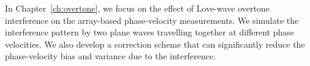 \documentclass[12pt,oneside]{book}
\begin{document}
In Chapter~\ref{ch:overtone}, we focus on the effect of Love-wave overtone interference on the array-based phase-velocity measurements. We simulate the interference pattern by two plane waves travelling together at different phase velocities. We also develop a correction scheme that can significantly reduce the phase-velocity bias and variance due to the interference. 

\cleardoublepage
\normalsize
\singlespacing


\clearpage
\end{document}
